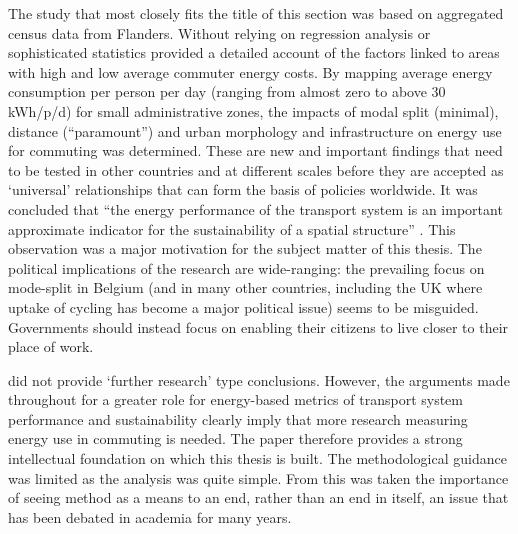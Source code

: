The study that most closely fits the title of this section
was based on aggregated census data from Flanders. Without relying on
regression analysis  or sophisticated statistics \citet{Boussauw2009}
provided a detailed account of the factors linked to areas with
high and low average commuter energy costs. By mapping average
energy consumption per person per day (ranging from almost zero
to above 30 kWh/p/d) for small administrative zones, the impacts of
modal split (minimal), distance (``paramount'') and urban morphology and
infrastructure on energy use for commuting was determined. These are new
and important findings that need to be tested in other countries
and at different scales
before they are accepted as `universal' relationships that can form the basis of
policies worldwide. It was concluded that
``the energy performance of the transport system is an important approximate
indicator for the sustainability of a spatial structure'' \citep[590]{Boussauw2009}.
This observation was a major motivation for the subject matter of this thesis.
The political implications of the research are wide-ranging: the prevailing
focus on mode-split in Belgium (and in many other countries, including the
UK where uptake of cycling has become a major political issue) seems to be misguided.
Governments should instead focus on enabling their citizens to live closer to their
place of work.

\citet{Boussauw2009} did not provide `further research' type conclusions. However,
the arguments made throughout for a greater role for energy-based metrics of
transport system performance and sustainability clearly imply that more
research measuring energy use in commuting is needed. The paper therefore
provides a strong intellectual foundation on which this thesis is built.
The methodological guidance was limited as the analysis was quite simple.
From this was taken the importance of seeing method as a means to an end,
rather than an end in itself, an issue that has been debated in academia for
many years. 

% 

